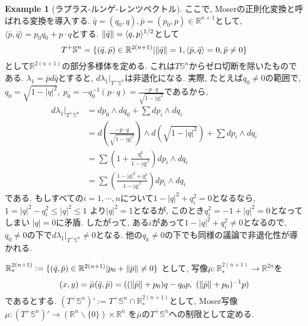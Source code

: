 \documentclass[a4paper]{ujarticle}
\numberwithin{equation}{section}
\theoremstyle{definition}
\newtheorem{example}{Example}
\begin{document}
\begin{example}[ラプラス-ルンゲ-レンツベクトル]
            ここで, Moserの正則化変換と呼ばれる変換を導入する.
            $\bar{q} = (q_0, q), \bar{p} = (p_0, p) \in \mathbb{R}^{n+1}$として, $\langle \bar{p}, \bar{q}\rangle = p_0 q_0 + p \cdot q$とする.
            $\norm{\bar{q}} = \langle q, p\rangle^{1/2}$として
            \[
                T^{+}\mathbb{S}^{n} = \{(\bar{q}, \bar{p}) \in \mathbb{R}^{2(n+1)} | \norm{\bar{q}} = 1, \langle \bar{p}, \bar{q} \rangle = 0, \bar{p} \neq 0\}
            \]
            として$\mathbb{R}^{2(n + 1)}$の部分多様体を定める. これは$T \mathbb{S}^{n}$からゼロ切断を除いたものである.
            $\lambda_1 = \bar{p} d\bar{q}$とすると, $d \lambda_1 |_{T^{+}\mathbb{S}^{n}}$は非退化になる.
            実際, たとえば$q_0 \neq 0$の範囲で, 
            $\displaystyle q_0 = \sqrt{1 - |q|^2}, \ p_0 = - q_0^{-1} (p \cdot q) = \frac{- p \cdot q}{\sqrt{1 - |q|^2}}$であるから, 
            \begin{align}
                d \lambda_1 |_{T^{+}\mathbb{S}^{n}}
                &= d p_0 \wedge d q_0 + \sum d p_i \wedge d q_i \\
                &= d \left( \frac{- p \cdot q}{\sqrt{1 - |q|^2}} \right) \wedge d(\sqrt{1 - |q|^2}) + \sum d p_i \wedge d q_i \\
                &= \sum \left( 1 + \frac{q_i^2}{1 - |q|^2}\right) d p_i \wedge d q_i  \\
                &= \sum \left(\frac{1 - |q|^2 + q_i^2}{1 - |q|^2}\right) d p_i \wedge d q_i
            \end{align}
            である. もしすべての$i = 1, \cdots, n$について$1 - |q|^2 + q_i^2 = 0$となるなら,
            $1 = |q|^2 - q_i^2 \leq |q|^2 \leq 1$ より$|q|^2 = 1$となるが, このとき$q_i ^2 = -1 + |q|^2 = 0$となってしまい
            $|q| = 0$に矛盾. したがって, ある$i$があって$1 - |q|^2 + q_i^2 \neq 0$となるので, 
            $q_0 \neq 0$の下で$d \lambda_1 |_{T^{+}\mathbb{S}^{n}} \neq 0$となる.
            他の$q_k \neq 0$の下でも同様の議論で非退化性が導かれる.

            $\mathbb{R}^{2(n+1)}_{*} := \{(\bar{q}, \bar{p}) \in \mathbb{R}^{2(n+1)} | p_0 + \norm{\bar{p}} \neq 0\}$
            として, 写像$\bar{\mu} : \mathbb{R}^{2(n+1)}_{*} \rightarrow \mathbb{R}^{2n}$を
            \[
                (x, y) = \bar{\mu}(\bar{q}, \bar{p}) = ((\norm{\bar{p}} + p_0) q - q_0 p, \ (\norm{\bar{p}} + p_0)^{-1} p)
            \]
            であるとする. 
            $(T^{+} \mathbb{S}^{n})' := T^{+} \mathbb{S}^{n} \cap \mathbb{R}^{2(n+1)}_{*}$として,
            Moser写像$\mu: (T^{+} \mathbb{S}^{n})' \rightarrow (\mathbb{R}^{n} \backslash \{0\}) \times \mathbb{R}^{n}$
            を$\bar{\mu}$の$T^{+} \mathbb{S}^{n}$への制限として定める. 
            

\end{example}
\end{document}
